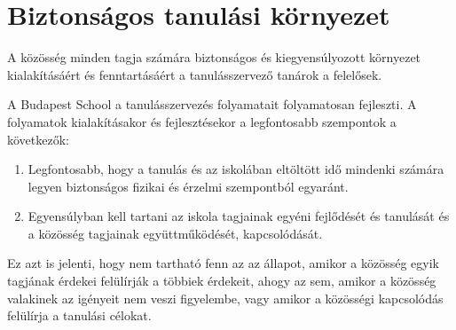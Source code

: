 \section{Biztonságos tanulási környezet}
A közösség minden tagja számára biztonságos és kiegyensúlyozott környezet kialakításáért és fenntartásáért a tanulásszervező tanárok a felelősek.

A Budapest School a tanulásszervezés folyamatait folyamatosan fejleszti. A folyamatok kialakításakor és fejlesztésekor a legfontosabb szempontok a következők:

\begin{enumerate}

      \item Legfontosabb, hogy a tanulás és az iskolában eltöltött idő mindenki számára legyen biztonságos fizikai és érzelmi szempontból egyaránt.

      \item Egyensúlyban kell tartani az iskola  tagjainak egyéni fejlődését és tanulását és a közösség tagjainak együttműködését, kapcsolódását.

\end{enumerate}
Ez azt is jelenti, hogy nem tartható fenn az az állapot, amikor a közösség egyik tagjának érdekei felülírják a többiek érdekeit, ahogy az sem, amikor a közösség valakinek az igényeit nem veszi figyelembe, vagy amikor a közösségi kapcsolódás felülírja a tanulási célokat.